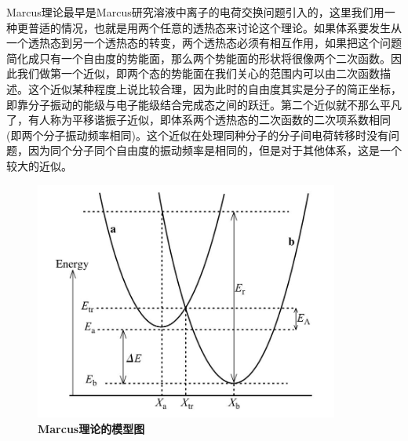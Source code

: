 \documentclass[12pt,a4paper,openany,twoside]{book}
\numberwithin{equation}{section}
\begin{document}
        Marcus理论最早是Marcus研究溶液中离子的电荷交换问题引入的\cite{Marcus1993}，这里我们用一种更普适的情况，也就是用两个任意的透热态来讨论这个理论。如果体系要发生从一个透热态到另一个透热态的转变，两个透热态必须有相互作用，如果把这个问题简化成只有一个自由度的势能面，那么两个势能面的形状将很像两个二次函数。因此我们做第一个近似，即两个态的势能面在我们关心的范围内可以由二次函数描述。这个近似某种程度上说比较合理，因为此时的自由度其实是分子的简正坐标，即靠分子振动的能级与电子能级结合完成态之间的跃迁。第二个近似就不那么平凡了，有人称为平移谐振子近似，即体系两个透热态的二次函数的二次项系数相同(即两个分子振动频率相同)。这个近似在处理同种分子的分子间电荷转移时没有问题，因为同个分子同个自由度的振动频率是相同的，但是对于其他体系，这是一个较大的近似。
        \begin{figure}
          \centering
          \includegraphics[width=10cm]{fig/Marcus.jpg}
          \caption{\textbf{Marcus理论的模型图}}
          \label{Marcus figure}
        \end{figure}
\end{document}
